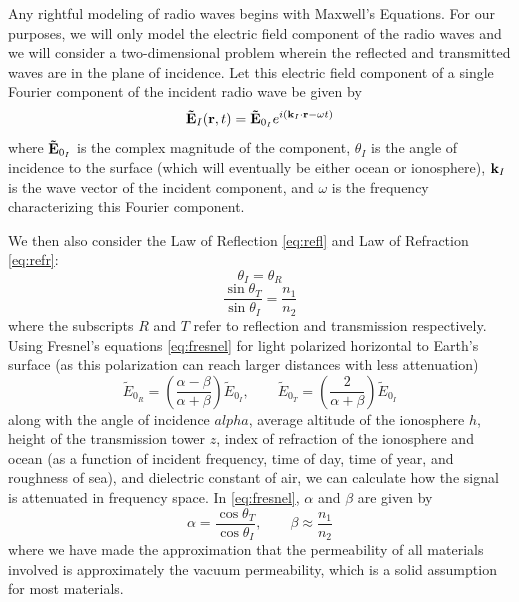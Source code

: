\documentclass[11pt]{article}
\numberwithin{equation}{section}
\begin{document}
Any rightful modeling of radio waves begins with Maxwell's Equations. For our purposes, we will only model the electric field component of the radio waves and we will consider a two-dimensional problem wherein the reflected and transmitted waves are in the plane of incidence. Let this electric field component of a single Fourier component of the incident radio wave be given by
\begin{equation}
{\bf \tilde{E}}_{I}({\bf r}, t) = {\bf \tilde{E}}_{0_I} e^{i({\bf k}_{I} \cdot {\bf r} - \omega t)}
\end{equation}
where ${\bf \tilde{E}}_{0_I}$ is the complex magnitude of the component, $\theta_{I}$ is the angle of incidence to the surface (which will eventually be either ocean or ionosphere), ${\bf k}_{I}$ is the wave vector of the incident component, and $\omega$ is the frequency characterizing this Fourier component.
\par We then also consider the Law of Reflection \ref{eq:refl} and Law of Refraction \ref{eq:refr}:
\begin{equation}
\theta_{I} = \theta_{R}
\label{refl}
\end{equation}
\begin{equation}
\frac{\sin\theta_{T}}{\sin\theta_{I}} = \frac{n_1}{n_2}
\label{refr}
\end{equation}
where the subscripts $R$ and $T$ refer to reflection and transmission respectively. Using Fresnel's equations \ref{eq:fresnel} for light polarized horizontal to Earth's surface (as this polarization can reach larger distances with less attenuation)
\begin{equation}
\tilde{E}_{0_R} = \left( \frac{\alpha - \beta}{\alpha + \beta} \right)\tilde{E}_{0_I}, \qquad 
\tilde{E}_{0_T} = \left( \frac{2}{\alpha + \beta} \right)\tilde{E}_{0_I}
\label{fresnel}
\end{equation}
along with the angle of incidence $alpha$, average altitude of the ionosphere $h$, height of the transmission tower $z$, index of refraction of the ionosphere and ocean (as a function of incident frequency, time of day, time of year, and roughness of sea), and dielectric constant of air, we can calculate how the signal is attenuated in frequency space. In \ref{eq:fresnel}, $\alpha$ and $\beta$ are given by
\begin{equation}
\alpha = \frac{\cos\theta_{T}}{\cos\theta_{I}}, \qquad \beta \approx \frac{n_1}{n_2}
\end{equation}
where we have made the approximation that the permeability of all materials involved is approximately the vacuum permeability, which is a solid assumption for most materials\cite{griffiths2005}. 
\end{document}

